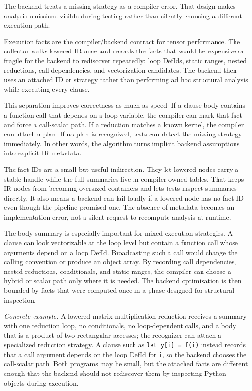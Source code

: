 The backend treats a missing strategy as a compiler error. That design makes
analysis omissions visible during testing rather than silently choosing a
different execution path.

Execution facts are the compiler/backend contract for tensor performance. The
collector walks lowered IR once and records the facts that would be expensive
or fragile for the backend to rediscover repeatedly: loop DefIds, static
ranges, nested reductions, call dependencies, and vectorization candidates. The
backend then uses an attached ID or strategy rather than performing ad hoc
structural analysis while executing every clause.

This separation improves correctness as much as speed. If a clause body
contains a function call that depends on a loop variable, the compiler can mark
that fact and force a call-scalar path. If a reduction matches a known kernel,
the compiler can attach a plan. If no plan is recognized, tests can detect the
missing strategy immediately. In other words, the algorithm turns implicit
backend assumptions into explicit IR metadata.

The fact IDs are a small but useful indirection. They let lowered nodes carry a
stable handle while the full summaries live in compiler-owned tables. That keeps
IR nodes from becoming oversized containers and lets tests inspect summaries
directly. It also means a backend can fail loudly if a lowered node has no fact
ID even though the pipeline promised one. The absence of metadata becomes an
implementation error, not a silent request to recompute analysis at runtime.

The body summary is especially important for mixed execution strategies. A
clause can look vectorizable at the loop level but contain a function call whose
arguments depend on a loop DefId. Broadcasting such a call would change the
calling convention or produce an object array. By recording call dependencies,
nested reductions, conditionals, and static ranges, the compiler can choose a
hybrid or scalar path only where it is needed. The backend optimization is then
bounded by facts that were computed once in a phase designed for structural
inspection.

\textit{Concrete example.} A lowered matrix multiplication reduction receives a
summary with one reduction loop, no conditionals, no loop-dependent calls, and a
body that is a product of two rectangular accesses; the recognizer can attach a
specialized reduction strategy. A clause such as \texttt{let y[i] = f(i)}
instead records that a call argument depends on the loop DefId for \texttt{i},
so the backend chooses the call-scalar path. Both programs may be small, but
the attached facts are different enough that the backend should not rediscover
them by inspecting Python objects during execution.

